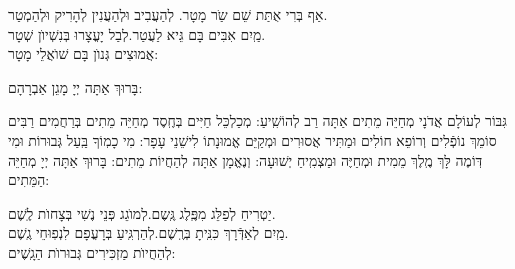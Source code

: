 \documentclass[twoside, openany, parskip=half, 11pt]{book}
\begin{document}


 אַף בְּרִי אֻתַּת שֵׁם שַֹר מָטָר. \hfill לְהַעֲבִיב וּלְהַעֲנִין לְהָרִיק וּלְהַמְטַר.\\
 מַֽיִם אִבִּים בָּם גֵּיא לַעֲטַר.\hfill לְבַל יָעֳצָרוּ בְּנִשְׁיוׂן שְׁטָר.\\
 אֲמוּצִים גְּנוׂן בָּם שׁוׂאֲלֵי מָטָר:



בָּרוּךְ אַתָּה יְיָ מָגֵן אַבְרָהָם:

 גִּבּוֹר לְעוֹלָם אֲדֹנָי מְחַיֵּה מֵתִים אַתָּה רַב לְהוֹשִֽׁיעַ: מְכַלְכֵּל חַיִּים בְּחֶֽסֶד מְחַיֵּה מֵתִים בְּרַחֲמִים רַבִּים סוֹמֵךְ נוֹפְֿלִים וְרוֹפֵא חוֹלִים וּמַתִּיר אֲסוּרִים וּמְקַיֵּם אֱמוּנָתוֹ לִישֵׁנֵי עָפָר: מִי כָמֽוֹךָ בַּֽעַל גְּבוּרוֹת וּמִי דּֽוֹמֶה לָּךְ מֶֽלֶךְ מֵמִית וּמְחַיֶּה וּמַצְמִֽיחַ יְשׁוּעָה: וְנֶאֱמָן אַתָּה לְהַחֲיוֹת מֵתִים: בָּרוּךְ אַתָּה יְיָ מְחַיֵּה הַמֵּתִים:





יַטְרִיחַ לְפַלֵּג מִפֶּֽלֶג גֶּֽשֶם.\hfill לְמוׂגֵג פְּנֵי נֶשִׁי בְּצָחוׂת לֶֽשֶׁם.\\
 מַֽיִם לְאַדְּֿרָךְ כִּנִּֽיתָ בְּרֶֽשֶׁם.\hfill לְהַרְגִּֽיעַ בְּרָעֳפָם לִנְפֽוּחֵי גֶֽשֶׁם.\\
 לְהַחֲיוׂת מַזְכִּירִים גְּבוּרוׂת הַגָֽשֶׁים:
\end{document}
